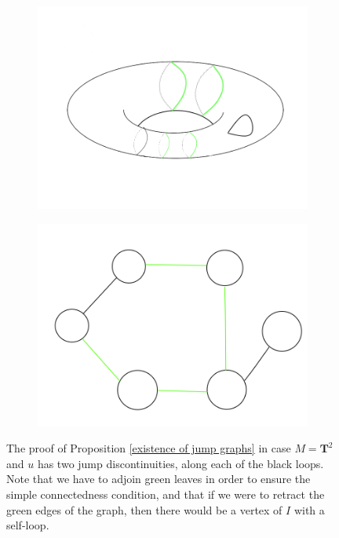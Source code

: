 \documentclass[reqno,10pt]{amsart}
\theoremstyle{definition}
\numberwithin{equation}{section}
\begin{document}
\begin{figure}
\centering
\begin{subfigure}[b]{0.4\linewidth}
\includegraphics[width=\linewidth]{sample torus.png}
\end{subfigure}
\begin{subfigure}[b]{0.4\linewidth}
\includegraphics[width=\linewidth]{torus graph.png}
\end{subfigure}
\caption{The proof of Proposition \ref{existence of jump graphs} in case $M = \mathbf T^2$ and $u$ has two jump discontinuities, along each of the black loops. Note that we have to adjoin green leaves in order to ensure the simple connectedness condition, and that if we were to retract the green edges of the graph, then there would be a vertex of $I$ with a self-loop.}
\label{torus graphs}
\end{figure}
\end{document}
